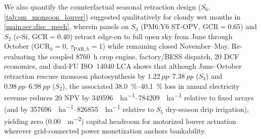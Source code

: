 \documentclass[preprint,12pt,a4paper]{elsarticle}
\begin{document}
We also quantify the counterfactual seasonal retraction design ($S_6$, \cref{tab:sm_monsoon_louver}) suggested qualitatively for cloudy wet months in \cref{main:sec:disc_mech}, wherein panels on $S_3$ (PM6:Y6 ST-OPV, $\mathrm{GCR}=\num{0.65}$) and $S_2$ (c-Si, $\mathrm{GCR}=\num{0.40}$) retract edge-on to full open sky from June through October ($\mathrm{GCR}_h=0$, $\tau_{\mathrm{PAR},h}=1$) while remaining closed November--May. Re-evaluating the coupled \qty{8760}{\hour} crop engine, factory/BESS dispatch, \qty{20}{\yr} DCF economics, and dual-FU ISO~14040 LCA shows that although June--October retraction rescues monsoon photosynthesis by $\qtyrange{+1.22}{+7.38}{pp}$ ($S_3$) and $\qtyrange{+0.98}{+6.98}{pp}$ ($S_2$), the associated \qtyrange{38.0}{40.1}{\percent} loss in annual electricity revenue reduces \qty{20}{\yr} NPV by \qtyrange{349596}{784209}{\USD\per\hectare} relative to fixed arrays (and by \qtyrange{357696}{826855}{\USD\per\hectare} relative to $S_5$ dry-season drip irrigation), yielding zero (\qty{0.00}{\USD\per\square\meter}) capital headroom for motorized louver actuation wherever grid-connected power monetization anchors bankability.
\end{document}
